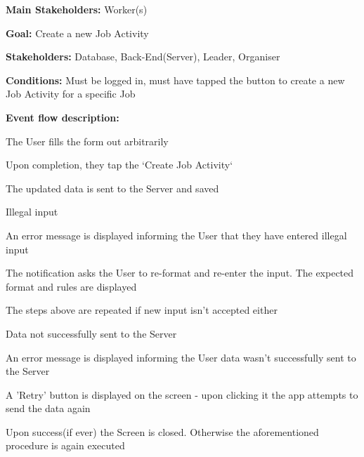 			\noindent {}
			\begin{packed_item}
				\item \textbf{Main Stakeholders:} Worker(s)
				\item \textbf{Goal:} Create a new Job Activity
				\item \textbf{Stakeholders: } Database, Back-End(Server), Leader, Organiser
				\item \textbf{Conditions: } Must be logged in, must have tapped the button to create a new Job Activity for a specific Job
				\item \textbf{Event flow description: }
				\begin{packed_enum}
					\item The User fills the form out arbitrarily
					\item Upon completion, they tap the `Create Job Activity`
					\item The updated data is sent to the Server and saved
				\end{packed_enum}
				
				\begin{packed_item}
					\item[1.a] Illegal input
					\item[] \begin{packed_enum}
						\item An error message is displayed informing the User that they have entered illegal input
						\item The notification asks the User to re-format and re-enter the input. The expected format and rules are displayed
						\item The steps above are repeated if new input isn't accepted either
					\end{packed_enum}
					
					\item[3.a] Data not successfully sent to the Server
					\item[] \begin{packed_enum}
						\item An error message is displayed informing the User data wasn't successfully sent to the Server
						\item A 'Retry' button is displayed on the screen - upon clicking it the app attempts to send the data again
						\item Upon success(if ever) the Screen is closed. Otherwise the aforementioned procedure is again executed
					\end{packed_enum}
				\end{packed_item}
			\end{packed_item}
			
